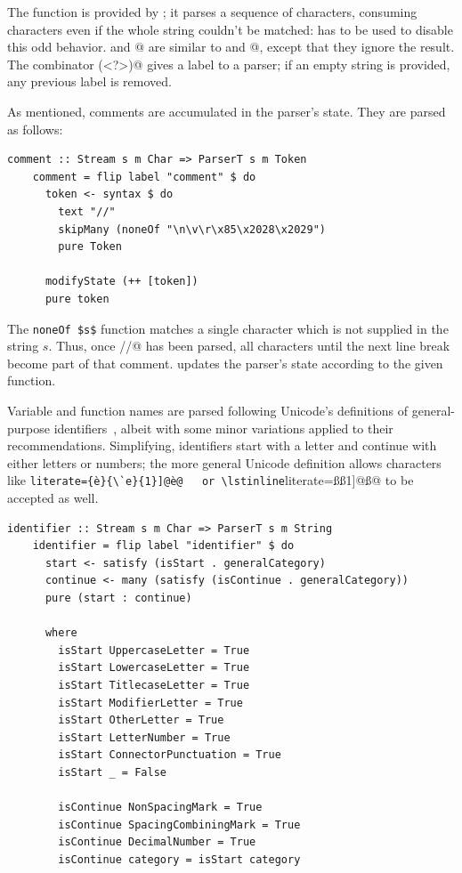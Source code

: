 \documentclass[UdineBachThesis,american,11pt]{PhdThesis}
\begin{document}
  The function \lstinline@string@ is provided by \lstinline@parsec@; it parses a
  sequence of characters, consuming characters even if the whole string couldn't
  be matched: \lstinline@try@ has to be used to disable this odd behavior.
  \lstinline@skipMany@ and @ are similar to \lstinline@many@
  and @, except that they ignore the result. The combinator
  \lstinline@(<?>)@ gives a label to a parser; if an empty string is provided,
  any previous label is removed.

  As mentioned, comments are accumulated in the parser's state. They are parsed
  as follows:

  \begin{lstlisting}[gobble=4,basicstyle=\ttfamily\small]
    comment :: Stream s m Char => ParserT s m Token
    comment = flip label "comment" $ do
      token <- syntax $ do
        text "//"
        skipMany (noneOf "\n\v\r\x85\x2028\x2029")
        pure Token

      modifyState (++ [token])
      pure token
  \end{lstlisting}

  The \lstinline[mathescape]@noneOf $s$@ function matches a single character
  which is not supplied in the string $s$. Thus, once \lstinline@//@ has been
  parsed, all characters until the next line break become part of that comment.
  \lstinline@modifyState@ updates the parser's state according to the given
  function.

  Variable and function names are parsed following Unicode's definitions of
  general-purpose identifiers~\cite{identifier-syntax}, albeit with some minor
  variations applied to their recommendations. Simplifying, identifiers start
  with a letter and continue with either letters or numbers; the more general
  Unicode definition allows characters like \lstinline[literate={è}{\`e}{1}]@è@
  or \lstinline[literate={ß}{\ss}{1}]@ß@ to be accepted as well.

  \newpage

  \begin{lstlisting}[gobble=4,basicstyle=\ttfamily\small]
    identifier :: Stream s m Char => ParserT s m String
    identifier = flip label "identifier" $ do
      start <- satisfy (isStart . generalCategory)
      continue <- many (satisfy (isContinue . generalCategory))
      pure (start : continue)

      where
        isStart UppercaseLetter = True
        isStart LowercaseLetter = True
        isStart TitlecaseLetter = True
        isStart ModifierLetter = True
        isStart OtherLetter = True
        isStart LetterNumber = True
        isStart ConnectorPunctuation = True
        isStart _ = False

        isContinue NonSpacingMark = True
        isContinue SpacingCombiningMark = True
        isContinue DecimalNumber = True
        isContinue category = isStart category
  \end{lstlisting}
\end{document}
